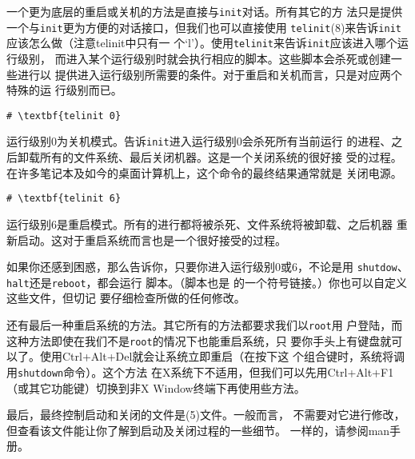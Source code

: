 一个更为底层的重启或关机的方法是直接与\texttt{init}对话。所有其它的方
法只是提供一个与\texttt{init}更为方便的对话接口，但我们也可以直接使用
\texttt{telinit}(8)来告诉\texttt{init}应该怎么做（注意telinit中只有一
个`l'）。使用\texttt{telinit}来告诉\texttt{init}应该进入哪个运行级别，
而进入某个运行级别时就会执行相应的脚本。这些脚本会杀死或创建一些进行以
提供进入运行级别所需要的条件。对于重启和关机而言，只是对应两个特殊的运
行级别而已。
\begin{Verbatim}[frame=single, commandchars=\\\{\}]
# \textbf{telinit 0}
\end{Verbatim}
运行级别0为关机模式。告诉\texttt{init}进入运行级别0会杀死所有当前运行
的进程、之后卸载所有的文件系统、最后关闭机器。这是一个关闭系统的很好接
受的过程。在许多笔记本及如今的桌面计算机上，这个命令的最终结果通常就是
关闭电源。

\begin{Verbatim}[frame=single, commandchars=\\\{\}]
# \textbf{telinit 6}
\end{Verbatim}
运行级别6是重启模式。所有的进行都将被杀死、文件系统将被卸载、之后机器
重新启动。这对于重启系统而言也是一个很好接受的过程。

如果你还感到困惑，那么告诉你，只要你进入运行级别0或6，不论是用
\texttt{shutdow}、\texttt{halt}还是\texttt{reboot}，都会运行
脚本。（脚本也是
的一个符号链接。）你也可以自定义这些文件，但切记
要仔细检查所做的任何修改。

还有最后一种重启系统的方法。其它所有的方法都要求我们以\texttt{root}用
户登陆，而这种方法即使在我们不是\texttt{root}的情况下也能重启系统，只
要你手头上有键盘就可以了。使用Ctrl+Alt+Del就会让系统立即重启（在按下这
个组合键时，系统将调用\texttt{shutdown}命令）。这个方法
在X系统下不适用，但我们可以先用Ctrl+Alt+F1（或其它功能键）切换到非X
Window终端下再使用些方法。

最后，最终控制启动和关闭的文件是(5)文件。一般而言，
不需要对它进行修改，但查看该文件能让你了解到启动及关闭过程的一些细节。
一样的，请参阅man手册。


